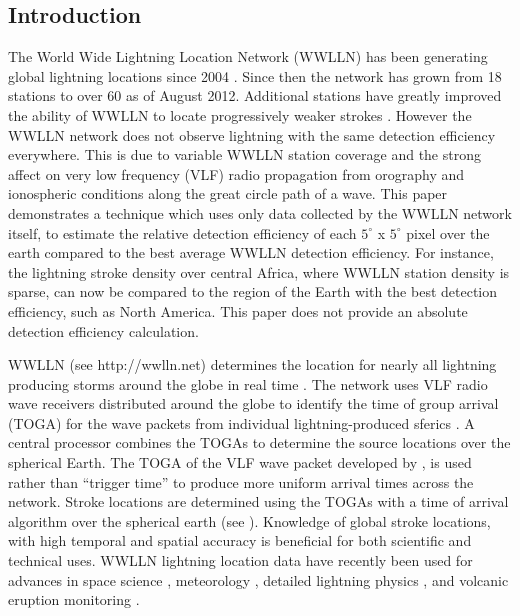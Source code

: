 \documentclass[draft,ras]{agutex}
\begin{document}
\begin{article}

\section{Introduction}

The World Wide Lightning Location Network (WWLLN) has been generating global lightning locations since 2004 \citep{Rodger2006, Rodger2009}. Since then the network has grown from 18 stations to over 60 as of August 2012. Additional stations have greatly improved the ability of WWLLN to locate progressively weaker strokes \citep{Rodger2009, Abarca2010}. However the WWLLN network does not observe lightning with the same detection efficiency everywhere. This is due to variable WWLLN station coverage and the strong affect on very low frequency (VLF) radio propagation from orography and ionospheric conditions along the great circle path of a wave. This paper demonstrates a technique which uses only data collected by the WWLLN network itself, to estimate the relative detection efficiency of each $5^\circ$ x $5^\circ$ pixel over the earth compared to the best average WWLLN detection efficiency. For instance, the lightning stroke density over central Africa, where WWLLN station density is sparse, can now be compared to the region of the Earth with the best detection efficiency, such as North America. This paper does not provide an absolute detection efficiency calculation.

WWLLN (see http://wwlln.net) determines the location for nearly all lightning producing storms around the globe in real time \citep{Jacobson2006c}. The network uses VLF radio wave receivers distributed around the globe to identify the time of group arrival (TOGA) for the wave packets from individual lightning-produced sferics \citep{Dowden2002d}. A central processor combines the TOGAs to determine the source locations over the spherical Earth. The TOGA of the VLF wave packet developed by \citet{Dowden2000}, is used rather than ``trigger time'' to produce more uniform arrival times across the network. Stroke locations are determined using the TOGAs with  a time of arrival algorithm over the spherical earth (see \citet{Rodger2009, Rodger2009a}). Knowledge of global stroke locations, with high temporal and spatial accuracy is beneficial for both scientific and technical uses. WWLLN lightning location data have recently been used for advances in space science \citep{Lay2007, Kumar2009, Collier2009, Holzworth2011, Jacobson2011}, meteorology \citep{Price2009,Thomas2010d}, detailed lightning physics \citep{Connaughton2010}, and volcanic eruption monitoring \citep{Doughton2010}.


\end{article}
\end{document}
